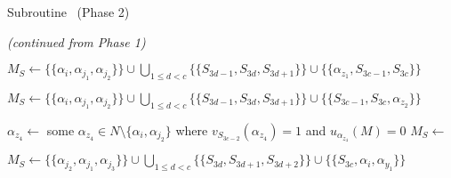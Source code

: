 \begin{algorithm}[t!]
\begin{algorithmic}
\caption{Subroutine~ (Phase 2) \label{alg:threed_sr_as_almostthere_algo_phase2}}

\medskip

\State \emph{(continued from Phase 1)}
\medskip

\State $M_{S} \gets \{\{ \alpha_i, \alpha_{j_1}, \alpha_{j_2} \}\} \cup \bigcup\limits_{1 \leq d < c}\{ \{ S_{3d-1}, S_{3d}, S_{3d+1} \} \} \cup \{\{ \alpha_{z_1}, S_{3c-1}, S_{3c} \}\}$

\vspace*{1.5pt}

\State $M_{S} \gets \{\{ \alpha_i, \alpha_{j_1}, \alpha_{j_2} \}\} \cup \bigcup\limits_{1 \leq d < c}\{ \{ S_{3d-1}, S_{3d}, S_{3d+1} \} \} \cup \{\{ S_{3c-1}, S_{3c}, \alpha_{z_2} \}\}$

\vspace*{2pt}

\State $\alpha_{z_4} \gets$ some $\alpha_{z_4} \in N\setminus \{ \alpha_i, \alpha_{j_2} \}$ where $v_{S_{3c-2}}(\alpha_{z_4})=1 $ and $ u_{\alpha_{z_4}}(M)=0$
\vspace*{1.5pt}
\State $M_{S} \gets $

\vspace*{1.5pt}

\State $M_{S} \gets \{\{ \alpha_{j_2}, \alpha_{j_1}, \alpha_{j_3} \}\} \cup \bigcup\limits_{1 \leq d < c}\{ \{ S_{3d}, S_{3d+1}, S_{3d+2} \} \} \cup \{\{ S_{3c}, \alpha_i, \alpha_{y_1} \}\}$

\vspace*{1.5pt}


\end{algorithmic}
\end{algorithm}

